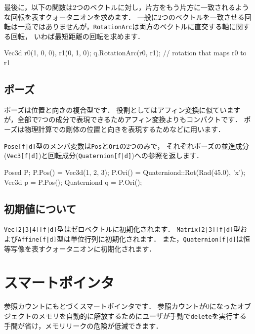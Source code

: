 \KLUDGE 最後に，以下の関数は2つのベクトルに対し，片方をもう片方に一致されるような回転を表すクォータニオンを求めます．
\KLUDGE 一般に2つのベクトルを一致させる回転は一意ではありませんが，\texttt{RotationArc}は両方のベクトルに直交する軸に関する回転，
\KLUDGE いわば最短距離の回転を求めます．
\begin{sourcecode}
Vec3d r0(1, 0, 0), r1(0, 1, 0);
q.RotationArc(r0, r1);    // rotation that maps r0 to r1 
\end{sourcecode}

\subsection*{ポーズ}


\KLUDGE ポーズは位置と向きの複合型です．
\KLUDGE 役割としてはアフィン変換に似ていますが，全部で7つの成分で表現できるためアフィン変換よりもコンパクトです．
\KLUDGE ポーズは物理計算での剛体の位置と向きを表現するためなどに用います．

\texttt{Pose[f|d]}型のメンバ変数は\texttt{Pos}と\texttt{Ori}の2つのみで，
\KLUDGE それぞれポーズの並進成分(\texttt{Vec3[f|d]})と回転成分(\texttt{Quaternion[f|d]})への参照を返します．
\begin{sourcecode}
Posed P;
P.Pos() = Vec3d(1, 2, 3);
P.Ori() = Quaterniond::Rot(Rad(45.0), 'x');
Vec3d p = P.Pos();
Quaterniond q = P.Ori();
\end{sourcecode}

\subsection*{初期値について}

\texttt{Vec[2|3|4][f|d]}型はゼロベクトルに初期化されます．
\texttt{Matrix[2|3][f|d]}型および\texttt{Affine[f|d]}型は単位行列に初期化されます．
\KLUDGE また，\texttt{Quaternion[f|d]}は恒等写像を表すクォータニオンに初期化されます．

\section{スマートポインタ}


\KLUDGE 参照カウントにもとづくスマートポインタです．
\KLUDGE 参照カウントが$0$になったオブジェクトのメモリを自動的に解放するためにユーザが手動で\texttt{delete}を実行する手間が省け，メモリリークの危険が低減できます．

